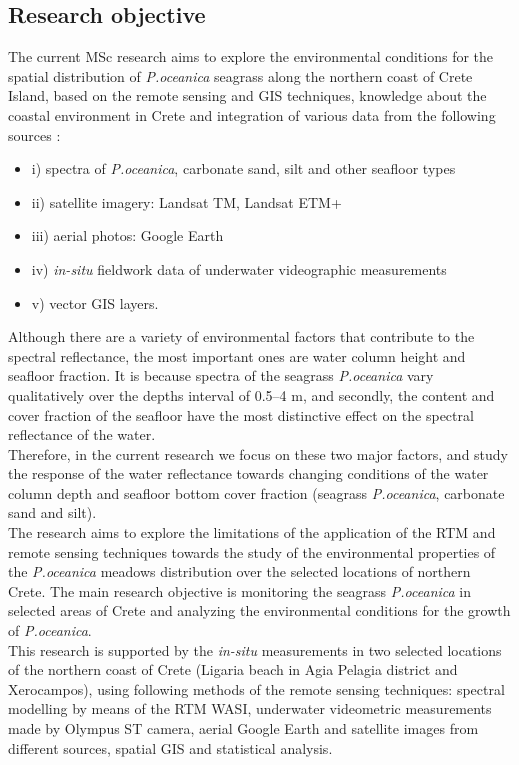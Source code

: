 \documentclass[11pt]{article}
\begin{document}
\subsection{Research objective}
The current MSc research aims to explore the environmental conditions for the spatial distribution of \textit{P.oceanica} seagrass along the northern coast of Crete Island, based on the remote sensing and \ac{GIS} techniques, knowledge about the coastal environment in Crete and integration of various data
from the following sources :
	\begin{itemize}
		\item[] i) spectra of \textit{P.oceanica}, carbonate sand, silt and other seafloor types
		\item[] ii) satellite imagery: \ac{Landsat TM}, \ac{Landsat ETM+}
		\item[] iii) aerial photos: Google Earth
		\item[] iv) \textit{in-situ} fieldwork data of underwater videographic measurements
		\item[] v) vector GIS layers.
	\end{itemize}
Although there are a variety of environmental factors that contribute to the spectral
reflectance, the most important ones are water column height and seafloor fraction.
It is because spectra of the seagrass \textit{P.oceanica} vary qualitatively over the depths interval of 0.5–4 m,
and secondly, the content and cover fraction of the seafloor have the most distinctive effect on the
spectral reflectance of the water. \\
Therefore, in the current research we focus on these two major factors, and study the response of the
water reflectance towards changing conditions of the water column depth and seafloor bottom cover
fraction (seagrass \textit{P.oceanica}, carbonate sand and silt).\\
The research aims to explore the limitations of the application of the \ac{RTM} and remote sensing techniques 
towards the study of the environmental properties of the \textit{P.oceanica} meadows distribution
over the selected locations of northern Crete. The main research objective is monitoring the seagrass \textit{P.oceanica} in selected areas of Crete and analyzing the environmental conditions for the growth of \textit{P.oceanica}. \\
This research is supported by the \textit{in-situ} measurements in two selected locations of the northern coast
of Crete (Ligaria beach in Agia Pelagia district and Xerocampos), using following methods of the
remote sensing techniques: spectral modelling by means of the \ac{RTM} \ac{WASI}, underwater videometric measurements made by \ac{Olympus ST} camera, aerial Google Earth and satellite images from different sources, spatial \ac{GIS} and statistical analysis.
\end{document}
